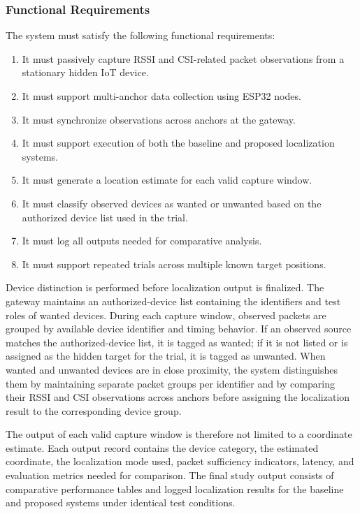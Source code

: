 \subsubsection{Functional Requirements}

The system must satisfy the following functional requirements:

\begin{enumerate}
    \item It must passively capture RSSI and CSI-related packet observations from a stationary hidden IoT device.
    \item It must support multi-anchor data collection using ESP32 nodes.
    \item It must synchronize observations across anchors at the gateway.
    \item It must support execution of both the baseline and proposed localization systems.
    \item It must generate a location estimate for each valid capture window.
    \item It must classify observed devices as wanted or unwanted based on the authorized device list used in the trial.
    \item It must log all outputs needed for comparative analysis.
    \item It must support repeated trials across multiple known target positions.
\end{enumerate}

Device distinction is performed before localization output is finalized. The gateway maintains an authorized-device list containing the identifiers and test roles of wanted devices. During each capture window, observed packets are grouped by available device identifier and timing behavior. If an observed source matches the authorized-device list, it is tagged as wanted; if it is not listed or is assigned as the hidden target for the trial, it is tagged as unwanted. When wanted and unwanted devices are in close proximity, the system distinguishes them by maintaining separate packet groups per identifier and by comparing their RSSI and CSI observations across anchors before assigning the localization result to the corresponding device group.

The output of each valid capture window is therefore not limited to a coordinate estimate. Each output record contains the device category, the estimated coordinate, the localization mode used, packet sufficiency indicators, latency, and evaluation metrics needed for comparison. The final study output consists of comparative performance tables and logged localization results for the baseline and proposed systems under identical test conditions.


